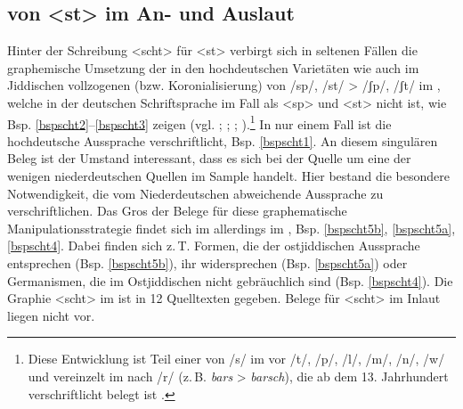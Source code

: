 \subsection{ von <st> im An- und Auslaut}\label{scht}
Hinter der Schreibung <scht> für <st> verbirgt sich in seltenen Fällen die graphemische Umsetzung der in den hochdeutschen Varietäten wie auch im Jiddischen vollzogenen  (bzw. Koronialisierung) von /sp/, /st/ > /ʃp/, /ʃt/ im , welche in der deutschen Schriftsprache im Fall als <sp> und <st> nicht  ist, wie Bsp. \ref{bspscht2}–\ref{bspscht3} zeigen (vgl. \cite[361]{Schirmunski1962}; \cite[365–368]{Bin-Nun1973}; \cite[272–277]{Timm1987}; \cite[§L 124]{Paul2007}).\footnote{Diese Entwicklung ist Teil einer  von /s/ im  vor /t/, /p/, /l/, /m/, /n/, /w/ und vereinzelt im  nach /r/ (z.\,B. \textit{bars} > \textit{barsch}), die ab dem 13. Jahrhundert verschriftlicht belegt ist  \parencite[§L 124]{Paul2007}.} In nur einem Fall ist die hochdeutsche Aussprache verschriftlicht, Bsp. \ref{bspscht1}. An diesem singulären Beleg  ist der Umstand interessant, dass es sich bei der Quelle um eine der wenigen niederdeutschen Quellen im Sample handelt. Hier bestand die besondere Notwendigkeit, die vom Niederdeutschen abweichende Aussprache zu verschriftlichen. Das Gros der Belege für diese graphematische Manipulationsstrategie findet sich im  allerdings im , Bsp. \ref{bspscht5b}, \ref{bspscht5a}, \ref{bspscht4}. Dabei finden sich z.\,T. Formen, die der ostjiddischen Aussprache entsprechen (Bsp. \ref{bspscht5b}), ihr widersprechen (Bsp. \ref{bspscht5a}) oder Germanismen, die im Ostjiddischen nicht gebräuchlich sind (Bsp. \ref{bspscht4}). Die Graphie <scht> im  ist in 12 Quelltexten gegeben. Belege für <scht> im Inlaut liegen nicht vor.\\ 

